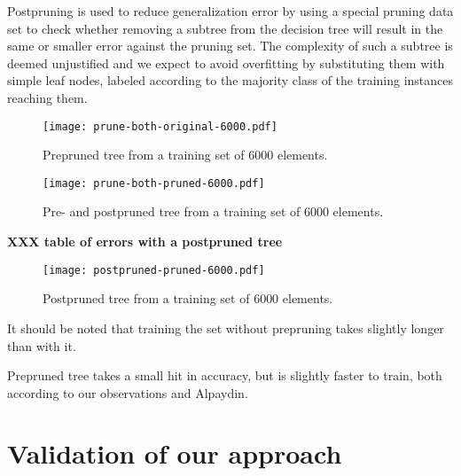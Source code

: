 \documentclass[a4paper,10pt]{article}
\newcommand{\XXX}[1]{{\bf XXX #1}}
\begin{document}
Postpruning is used to reduce generalization error by using a special
pruning data set to check whether removing a subtree from the decision
tree will result in the same or smaller error against the pruning set.
The complexity of such a subtree is deemed unjustified and we expect
to avoid overfitting by substituting them with simple leaf nodes,
labeled according to the majority class of the training instances
reaching them\cite[p. 183]{alpaydin2004}.

\begin{figure}[h]
  \centering
  \begin{minipage}[c]{1.0\textwidth}
    \centering

\texttt{[image: prune-both-original-6000.pdf]}
  \end{minipage}
  \caption{Prepruned tree from a training set of 6000 elements.}
  \label{fig:prune-both-original-6000}
\end{figure}

\begin{figure}[h]
  \centering
  \begin{minipage}[c]{1.0\textwidth}
    \centering

\texttt{[image: prune-both-pruned-6000.pdf]}
  \end{minipage}
  \caption{Pre- and postpruned tree from a training set of 6000 elements.}
  \label{fig:prune-both-pruned-6000}
\end{figure}

\XXX{table of errors with a postpruned tree}
\begin{figure}[h]
  \centering
  \begin{minipage}[c]{1.0\textwidth}
    \centering
\texttt{[image: postpruned-pruned-6000.pdf]}
  \end{minipage}
  \caption{Postpruned tree from a training set of 6000 elements.}
  \label{fig:no-pruning-6000}
\end{figure}

It should be noted that training the set without prepruning takes
slightly longer than with it.

Prepruned tree takes a small hit in accuracy, but is slightly faster to
train, both according to our observations and
Alpaydin\cite[p. 182]{alpaydin2004}.

\section{Validation of our approach}
\end{document}
